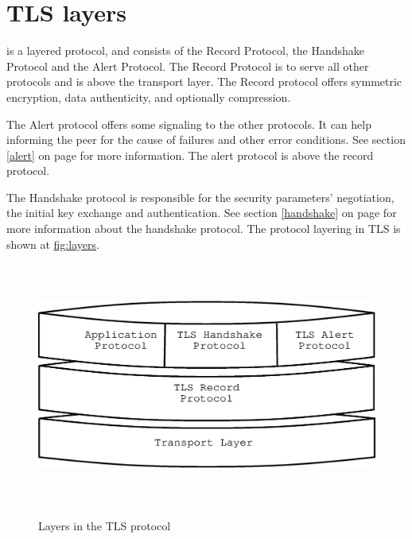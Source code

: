 \section{TLS layers}

\tlsI{} is a layered protocol, and consists of the Record Protocol,
the Handshake Protocol and the Alert Protocol. The Record Protocol
is to serve all other protocols and is above the transport layer.
The Record protocol offers symmetric encryption, data authenticity, and
optionally compression.

\par
The Alert protocol offers some signaling to the other protocols. It can
help informing the peer for the cause of failures and other error
conditions. See section \ref{alert} on page \pageref{alert} for more information.
The alert protocol is above the record protocol.

\par 
The Handshake protocol is responsible for the security parameters'
negotiation, the initial key exchange and
authentication. 
See section \ref{handshake} on page \pageref{handshake} for more information
about the handshake protocol.
The protocol layering in TLS is shown at \hyperref{figure}{figure }{}{fig:layers}.

\begin{figure}[hbtp]
\includegraphics[height=8cm,width=12cm]{layers}
\label{fig:layers}
\caption{Layers in the TLS protocol}
\end{figure}

\addvspace{1.5cm}


